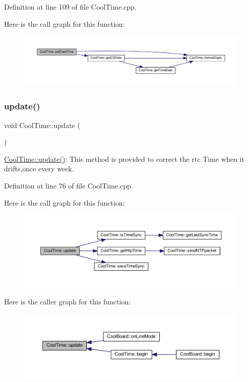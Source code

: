 Definition at line 109 of file Cool\+Time.\+cpp.

Here is the call graph for this function\+:\nopagebreak
\begin{figure}[H]
\begin{center}
\leavevmode
\includegraphics[width=350pt]{class_cool_time_ab81ea7fdaace111aa01cc1ec84c6d297_cgraph}
\end{center}
\end{figure}
\mbox{\label{class_cool_time_aae601f795452cfa48d9fb337aed483a8}} 
\subsubsection{\texorpdfstring{update()}{update()}}
{\footnotesize\ttfamily void Cool\+Time\+::update (\begin{DoxyParamCaption}{ }\end{DoxyParamCaption})}

\hyperlink{class_cool_time_aae601f795452cfa48d9fb337aed483a8}{Cool\+Time\+::update()}\+: This method is provided to correct the rtc Time when it drifts,once every week. 

Definition at line 76 of file Cool\+Time.\+cpp.

Here is the call graph for this function\+:\nopagebreak
\begin{figure}[H]
\begin{center}
\leavevmode
\includegraphics[width=350pt]{class_cool_time_aae601f795452cfa48d9fb337aed483a8_cgraph}
\end{center}
\end{figure}
Here is the caller graph for this function\+:\nopagebreak
\begin{figure}[H]
\begin{center}
\leavevmode
\includegraphics[width=350pt]{class_cool_time_aae601f795452cfa48d9fb337aed483a8_icgraph}
\end{center}
\end{figure}


